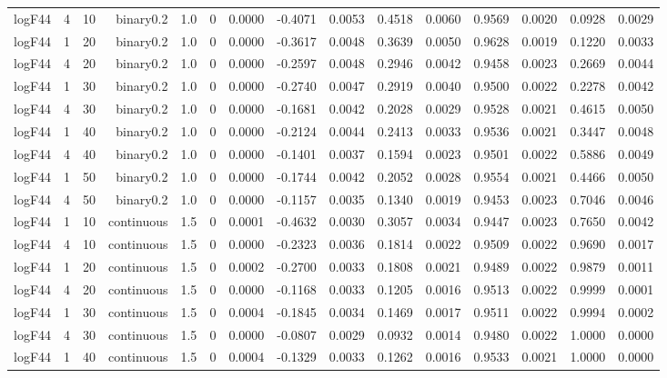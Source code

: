 \begin{longtable}{rrrrrrrrrrrrrrr}
  logF44 & 4 & 10 & binary0.2 & 1.0 & 0 & 0.0000 & -0.4071 & 0.0053 & 0.4518 & 0.0060 & 0.9569 & 0.0020 & 0.0928 & 0.0029 \\ 
  logF44 & 1 & 20 & binary0.2 & 1.0 & 0 & 0.0000 & -0.3617 & 0.0048 & 0.3639 & 0.0050 & 0.9628 & 0.0019 & 0.1220 & 0.0033 \\ 
  logF44 & 4 & 20 & binary0.2 & 1.0 & 0 & 0.0000 & -0.2597 & 0.0048 & 0.2946 & 0.0042 & 0.9458 & 0.0023 & 0.2669 & 0.0044 \\ 
  logF44 & 1 & 30 & binary0.2 & 1.0 & 0 & 0.0000 & -0.2740 & 0.0047 & 0.2919 & 0.0040 & 0.9500 & 0.0022 & 0.2278 & 0.0042 \\ 
  logF44 & 4 & 30 & binary0.2 & 1.0 & 0 & 0.0000 & -0.1681 & 0.0042 & 0.2028 & 0.0029 & 0.9528 & 0.0021 & 0.4615 & 0.0050 \\ 
  logF44 & 1 & 40 & binary0.2 & 1.0 & 0 & 0.0000 & -0.2124 & 0.0044 & 0.2413 & 0.0033 & 0.9536 & 0.0021 & 0.3447 & 0.0048 \\ 
  logF44 & 4 & 40 & binary0.2 & 1.0 & 0 & 0.0000 & -0.1401 & 0.0037 & 0.1594 & 0.0023 & 0.9501 & 0.0022 & 0.5886 & 0.0049 \\ 
  logF44 & 1 & 50 & binary0.2 & 1.0 & 0 & 0.0000 & -0.1744 & 0.0042 & 0.2052 & 0.0028 & 0.9554 & 0.0021 & 0.4466 & 0.0050 \\ 
  logF44 & 4 & 50 & binary0.2 & 1.0 & 0 & 0.0000 & -0.1157 & 0.0035 & 0.1340 & 0.0019 & 0.9453 & 0.0023 & 0.7046 & 0.0046 \\ 
  logF44 & 1 & 10 & continuous & 1.5 & 0 & 0.0001 & -0.4632 & 0.0030 & 0.3057 & 0.0034 & 0.9447 & 0.0023 & 0.7650 & 0.0042 \\ 
  logF44 & 4 & 10 & continuous & 1.5 & 0 & 0.0000 & -0.2323 & 0.0036 & 0.1814 & 0.0022 & 0.9509 & 0.0022 & 0.9690 & 0.0017 \\ 
  logF44 & 1 & 20 & continuous & 1.5 & 0 & 0.0002 & -0.2700 & 0.0033 & 0.1808 & 0.0021 & 0.9489 & 0.0022 & 0.9879 & 0.0011 \\ 
  logF44 & 4 & 20 & continuous & 1.5 & 0 & 0.0000 & -0.1168 & 0.0033 & 0.1205 & 0.0016 & 0.9513 & 0.0022 & 0.9999 & 0.0001 \\ 
  logF44 & 1 & 30 & continuous & 1.5 & 0 & 0.0004 & -0.1845 & 0.0034 & 0.1469 & 0.0017 & 0.9511 & 0.0022 & 0.9994 & 0.0002 \\ 
  logF44 & 4 & 30 & continuous & 1.5 & 0 & 0.0000 & -0.0807 & 0.0029 & 0.0932 & 0.0014 & 0.9480 & 0.0022 & 1.0000 & 0.0000 \\ 
  logF44 & 1 & 40 & continuous & 1.5 & 0 & 0.0004 & -0.1329 & 0.0033 & 0.1262 & 0.0016 & 0.9533 & 0.0021 & 1.0000 & 0.0000 \\ 

\end{longtable}
